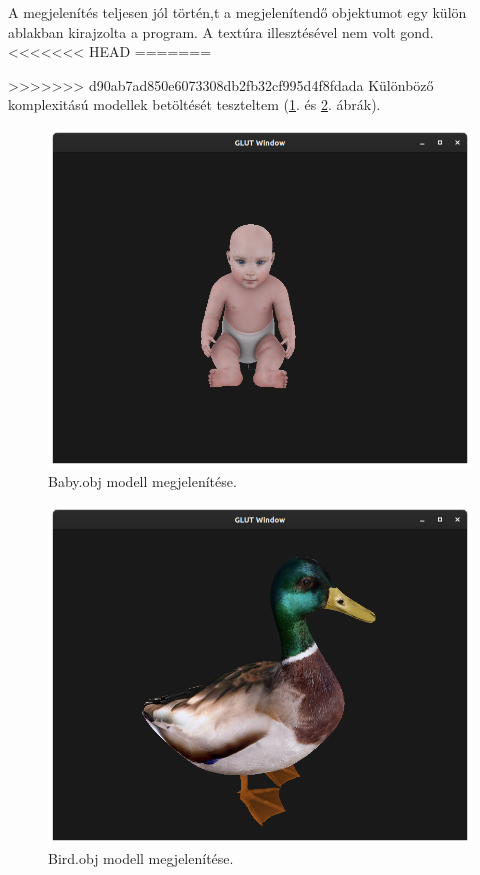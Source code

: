 A megjelenítés teljesen jól történ,t a megjelenítendő objektumot egy külön ablakban kirajzolta a program. A textúra illesztésével nem volt gond.
<<<<<<< HEAD
\newpage
=======

>>>>>>> d90ab7ad850e6073308db2fb32cf995d4f8fdada
Különböző komplexitású modellek betöltését teszteltem (\ref{fig:modelbaby}. és  \ref{fig:modelbird}. ábrák).

\begin{figure}[h]
\centering
\includegraphics[scale=0.35]{images/model1.png}
\caption{Baby.obj modell megjelenítése.}
\label{fig:modelbaby}
\end{figure}

\begin{figure}[h]
\centering
\includegraphics[scale=0.35]{images/bird.png}
\caption{Bird.obj modell megjelenítése.}
\label{fig:modelbird}
\end{figure}

